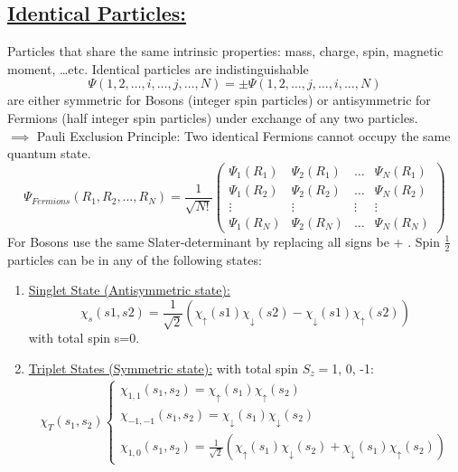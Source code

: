 \subsection*{\underline{Identical Particles:}}
Particles that share the same intrinsic properties: mass, charge, spin, magnetic moment, \dots etc. Identical particles are indistinguishable
\begin{equation}
    \Psi(1, 2, \dots, i, \dots, j, \dots, N)=\pm\Psi(1, 2, \dots, j, \dots, i, \dots, N)
\end{equation}
are either symmetric for Bosons (integer spin particles) or antisymmetric for Fermions (half integer spin particles) under exchange of any two particles.\\
$\implies$ Pauli Exclusion Principle: Two identical Fermions cannot occupy the same quantum state.
\begin{equation}
    \Psi_{Fermions}(R_1,R_2,\dots,R_N)= \frac{1}{\sqrt{N!}}
    \left(\begin{matrix}
            \Psi_1(R_1) & \Psi_2(R_1) & \dots  & \Psi_N(R_1) \\
            \Psi_1(R_2) & \Psi_2(R_2) & \dots  & \Psi_N(R_2) \\
            \vdots      & \vdots      & \vdots & \vdots      \\
            \Psi_1(R_N) & \Psi_2(R_N) & \dots  & \Psi_N(R_N)
        \end{matrix}\right)
\end{equation}
For Bosons use the same Slater-determinant by replacing all signs be + .
Spin $\frac{1}{2}$ particles can be in any of the following states:
\begin{enumerate}
    \item[] \underline{Singlet State (Antisymmetric state):} \begin{equation} \chi_s(s1,s2)=\frac{1}{\sqrt{2}}(\chi_{\uparrow}(s1)\chi_{\downarrow}(s2)-\chi_{\downarrow}(s1)\chi_{\uparrow}(s2)) \end{equation} with total spin s=0.
    \item[] \underline{Triplet States (Symmetric state):} with total spin $S_z=$1, 0, -1:
        \begin{gather}
            \chi_T(s_1, s_2) 
            \begin{cases}
                \chi_{1,1}(s_1,s_2)=\chi_{\uparrow}(s_1)\chi_{\uparrow}(s_2)       \\
                \chi_{-1,-1}(s_1,s_2)=\chi_{\downarrow}(s_1)\chi_{\downarrow}(s_2) \\
                \chi_{1,0}(s_1,s_2)=\frac{1}{\sqrt{2}}(\chi_{\uparrow}(s_1)\chi_{\downarrow}(s_2)+\chi_{\downarrow}(s_1)\chi_{\uparrow}(s_2))
            \end{cases}
        \end{gather}
\end{enumerate}